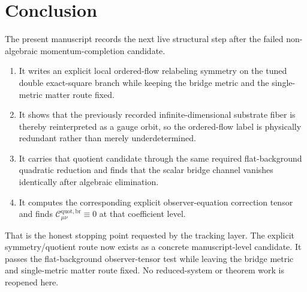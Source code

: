 \documentclass[11pt]{article}
\begin{document}
\section{Conclusion}

The present manuscript records the next live structural step after the failed non-algebraic momentum-completion candidate.
\begin{enumerate}
    \item It writes an explicit local ordered-flow relabeling symmetry on the tuned double exact-square branch while keeping the bridge metric and the single-metric matter route fixed.
    \item It shows that the previously recorded infinite-dimensional substrate fiber is thereby reinterpreted as a gauge orbit, so the ordered-flow label is physically redundant rather than merely underdetermined.
    \item It carries that quotient candidate through the same required flat-background quadratic reduction and finds that the scalar bridge channel vanishes identically after algebraic elimination.
    \item It computes the corresponding explicit observer-equation correction tensor and finds \(\mathcal C_{\mu\nu}^{\mathrm{quot,br}}\equiv0\) at that coefficient level.
\end{enumerate}

That is the honest stopping point requested by the tracking layer. The explicit symmetry/quotient route now exists as a concrete manuscript-level candidate. It passes the flat-background observer-tensor test while leaving the bridge metric and single-metric matter route fixed. No reduced-system or theorem work is reopened here.
\end{document}
